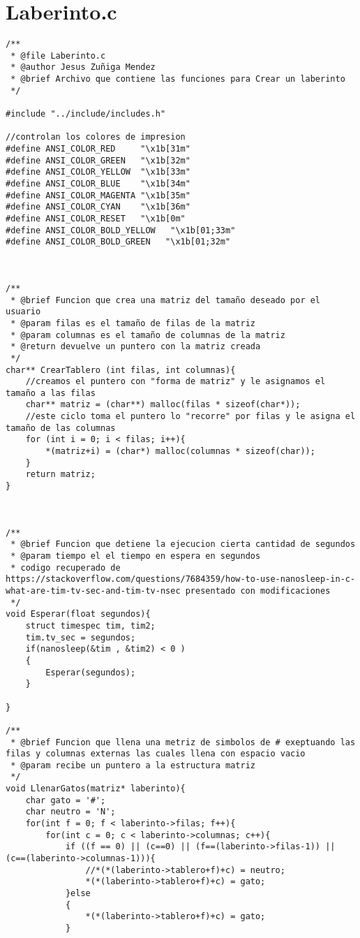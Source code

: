 \section{Laberinto.c}
\begin{verbatim}
/**
 * @file Laberinto.c
 * @author Jesus Zuñiga Mendez
 * @brief Archivo que contiene las funciones para Crear un laberinto
 */

#include "../include/includes.h"

//controlan los colores de impresion
#define ANSI_COLOR_RED     "\x1b[31m"
#define ANSI_COLOR_GREEN   "\x1b[32m"
#define ANSI_COLOR_YELLOW  "\x1b[33m"
#define ANSI_COLOR_BLUE    "\x1b[34m"
#define ANSI_COLOR_MAGENTA "\x1b[35m"
#define ANSI_COLOR_CYAN    "\x1b[36m"
#define ANSI_COLOR_RESET   "\x1b[0m"
#define ANSI_COLOR_BOLD_YELLOW   "\x1b[01;33m"
#define ANSI_COLOR_BOLD_GREEN   "\x1b[01;32m"



/**
 * @brief Funcion que crea una matriz del tamaño deseado por el usuario
 * @param filas es el tamaño de filas de la matriz
 * @param columnas es el tamaño de columnas de la matriz
 * @return devuelve un puntero con la matriz creada
 */
char** CrearTablero (int filas, int columnas){
    //creamos el puntero con "forma de matriz" y le asignamos el tamaño a las filas
    char** matriz = (char**) malloc(filas * sizeof(char*));
    //este ciclo toma el puntero lo "recorre" por filas y le asigna el tamaño de las columnas 
    for (int i = 0; i < filas; i++){
        *(matriz+i) = (char*) malloc(columnas * sizeof(char));
    } 
    return matriz;
}



/**
 * @brief Funcion que detiene la ejecucion cierta cantidad de segundos
 * @param tiempo el el tiempo en espera en segundos
 * codigo recuperado de https://stackoverflow.com/questions/7684359/how-to-use-nanosleep-in-c-what-are-tim-tv-sec-and-tim-tv-nsec presentado con modificaciones
 */
void Esperar(float segundos){
    struct timespec tim, tim2;
    tim.tv_sec = segundos;
    if(nanosleep(&tim , &tim2) < 0 )   
    {
        Esperar(segundos);
    }

}

/**
 * @brief Funcion que llena una metriz de simbolos de # exeptuando las filas y columnas externas las cuales llena con espacio vacio
 * @param recibe un puntero a la estructura matriz
 */
void LlenarGatos(matriz* laberinto){
    char gato = '#';
    char neutro = 'N';
    for(int f = 0; f < laberinto->filas; f++){
        for(int c = 0; c < laberinto->columnas; c++){
            if ((f == 0) || (c==0) || (f==(laberinto->filas-1)) || (c==(laberinto->columnas-1))){
                //*(*(laberinto->tablero+f)+c) = neutro;
                *(*(laberinto->tablero+f)+c) = gato;
            }else
            {
                *(*(laberinto->tablero+f)+c) = gato;
            }
            

\end{verbatim}

